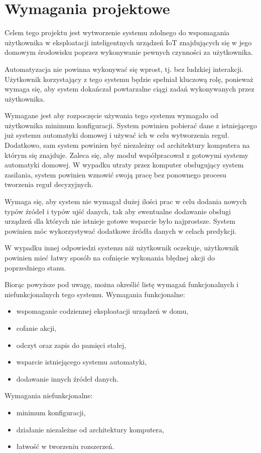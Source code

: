 \chapter{Wymagania projektowe}
\label{chapter:wymagania}
Celem tego projektu jest wytworzenie systemu zdolnego do wspomagania użytkownika w eksploatacji inteligentnych urządzeń IoT znajdujących się w jego domowym środowisku poprzez wykonywanie pewnych czynności za użytkownika. 

Automatyzacja nie powinna wykonywać się wprost, tj. bez ludzkiej interakcji. Użytkownik korzystający z tego systemu będzie spełniał kluczową rolę, ponieważ wymaga się, aby system dokańczał powtarzalne ciągi zadań wykonywanych przez użytkownika.

Wymagane jest aby rozpoczęcie używania tego systemu wymagało od użytkownika minimum konfiguracji. System powinien pobierać dane z istniejącego już systemu automatyki domowej i używać ich w celu wytworzenia reguł. Dodatkowo, sam system powinien być niezależny od architektury komputera na którym się znajduje. Zaleca się, aby moduł współpracował z gotowymi systemy automatyki domowej. W wypadku utraty przez komputer obsługujący system zasilania, system powinien wznowić swoją pracę bez ponownego procesu tworzenia reguł decyzyjnych.

Wymaga się, aby system nie wymagał dużej ilości prac w celu dodania nowych typów źródeł i typów ujść danych, tak aby ewentualne dodawanie obsługi urządzeń dla których nie istnieje gotowe wsparcie było najprostsze. System powinien móc wykorzystywać dodatkowe źródła danych w celach predykcji.

W wypadku innej odpowiedzi systemu niż użytkownik oczekuje, użytkownik powinien mieć łatwy sposób na cofnięcie wykonania błędnej akcji do poprzedniego stanu.

Biorąc powyższe pod uwagę, można określić listę wymagań funkcjonalnych i niefunkcjonalnych tego systemu.
Wymagania funkcjonalne:
\begin{itemize}
    \item wspomaganie codziennej eksploatacji urządzeń w domu,
    \item cofanie akcji,
    \item odczyt oraz zapis do pamięci stałej,
    \item wsparcie istniejącego systemu automatyki,
    \item dodawanie innych źródeł danych.
\end{itemize}
Wymagania niefunkcjonalne:
\begin{itemize}
    \item minimum konfiguracji,
    \item działanie niezależne od architektury komputera,
    \item łatwość w tworzeniu rozszerzeń.
\end{itemize}

